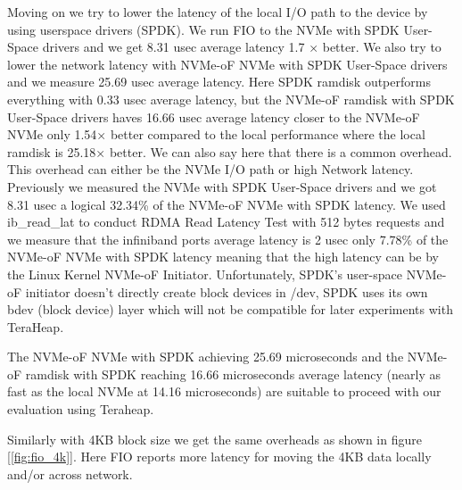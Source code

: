 \par Moving on we try to lower the latency of the local I/O path to the device by using userspace drivers (SPDK). We run FIO to the NVMe with SPDK User-Space drivers and we get 8.31 usec average latency 1.7 × better. We also try to lower the network latency with NVMe-oF NVMe with SPDK User-Space drivers and we measure 25.69 usec average latency. Here SPDK ramdisk outperforms everything with 0.33 usec average latency, but the NVMe-oF ramdisk with SPDK User-Space drivers haves 16.66 usec average latency closer to the NVMe-oF NVMe only 1.54× better compared to the local performance where the local ramdisk is 25.18× better. We can also say here that there is a common overhead. This overhead can either be the NVMe I/O path or high Network latency. Previously we measured the NVMe with SPDK User-Space drivers and we got 8.31 usec a logical 32.34\% of the NVMe-oF NVMe with SPDK latency. We used ib\_read\_lat to conduct RDMA Read Latency Test with 512 bytes requests and we measure that the infiniband ports average latency is 2 usec only 7.78\% of the NVMe-oF NVMe with SPDK latency meaning that the high latency can be by the Linux Kernel NVMe-oF Initiator. Unfortunately, SPDK's user-space NVMe-oF initiator doesn't directly create block devices in /dev, SPDK uses its own bdev (block device) layer which will not be compatible for later experiments with TeraHeap. 
\par The NVMe-oF NVMe with SPDK achieving 25.69 microseconds and the NVMe-oF ramdisk with SPDK reaching 16.66 microseconds average latency (nearly as fast as the local NVMe at 14.16 microseconds) are suitable to proceed with our evaluation using Teraheap.
\par Similarly with 4KB block size we get the same overheads as shown in figure [\ref{fig:fio_4k}]. Here FIO reports more latency for moving the 4KB data locally and/or across network.

